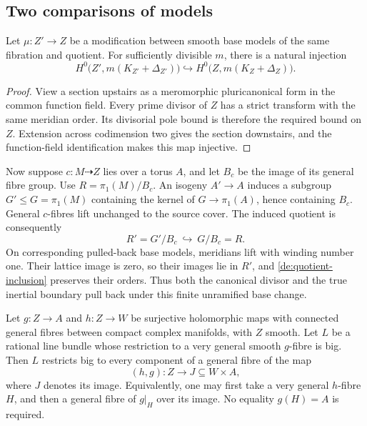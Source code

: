 \subsection{Two comparisons of models}

\begin{lemma}\label{de:birational-pushdown}
Let \(\mu:Z'\to Z\) be a modification between smooth base models
of the same fibration and quotient. For sufficiently divisible \(m\),
there is a natural injection
\[
 H^0\bigl(Z',m(K_{Z'}+\Delta_{Z'})\bigr)
 \hookrightarrow H^0\bigl(Z,m(K_Z+\Delta_Z)\bigr).
\]
\end{lemma}

\begin{proof}
View a section upstairs as a meromorphic pluricanonical form in the
common function field. Every prime divisor of \(Z\) has a strict
transform with the same meridian order. Its divisorial pole bound is
therefore the required bound on \(Z\). Extension across codimension
two gives the section downstairs, and the function-field identification
makes this map injective.
\end{proof}

Now suppose \(c:M\dashrightarrow Z\) lies over a torus \(A\),
and let \(B_c\) be the image of its general fibre group. Use
\(R=\pi_1(M)/B_c\). An isogeny \(A'\to A\) induces a subgroup
\(G'\le G=\pi_1(M)\) containing the kernel of
\(G\to\pi_1(A)\), hence containing \(B_c\). General
\(c\)-fibres lift unchanged to the source cover. The induced
quotient is consequently
\begin{equation}\label{de:quotient-inclusion}
 R'=G'/B_c\ \hookrightarrow\ G/B_c=R.
\end{equation}
On corresponding pulled-back base models, meridians lift with winding
number one. Their lattice image is zero, so their images lie in
\(R'\), and \eqref{de:quotient-inclusion} preserves their orders.
Thus both the canonical divisor and the true inertial boundary pull
back under this finite unramified base change.

\begin{lemma}
\label{de:common-fibres}
Let \(g:Z\to A\) and \(h:Z\to W\) be surjective holomorphic
maps with connected general fibres between compact complex manifolds,
with \(Z\) smooth. Let \(L\)
be a rational line bundle whose restriction to a very general smooth
\(g\)-fibre is big. Then \(L\) restricts big to every component
of a general fibre of the map
\[
 (h,g):Z\longrightarrow J\subseteq W\times A,
\]
where \(J\) denotes its image. Equivalently, one may first take a
very general \(h\)-fibre \(H\), and then a general fibre of
\(g|_H\) over its image. No equality \(g(H)=A\) is required.
\end{lemma}

